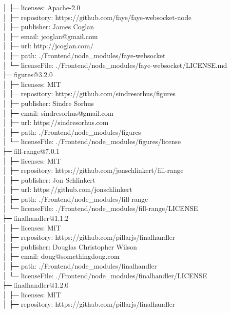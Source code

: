 │  ├─ licenses: Apache-2.0\\
│  ├─ repository: https://github.com/faye/faye-websocket-node\\
│  ├─ publisher: James Coglan\\
│  ├─ email: jcoglan@gmail.com\\
│  ├─ url: http://jcoglan.com/\\
│  ├─ path: ./Frontend/node\_modules/faye-websocket\\
│  └─ licenseFile: ./Frontend/node\_modules/faye-websocket/LICENSE.md\\
├─ figures@3.2.0\\
│  ├─ licenses: MIT\\
│  ├─ repository: https://github.com/sindresorhus/figures\\
│  ├─ publisher: Sindre Sorhus\\
│  ├─ email: sindresorhus@gmail.com\\
│  ├─ url: https://sindresorhus.com\\
│  ├─ path: ./Frontend/node\_modules/figures\\
│  └─ licenseFile: ./Frontend/node\_modules/figures/license\\
├─ fill-range@7.0.1\\
│  ├─ licenses: MIT\\
│  ├─ repository: https://github.com/jonschlinkert/fill-range\\
│  ├─ publisher: Jon Schlinkert\\
│  ├─ url: https://github.com/jonschlinkert\\
│  ├─ path: ./Frontend/node\_modules/fill-range\\
│  └─ licenseFile: ./Frontend/node\_modules/fill-range/LICENSE\\
├─ finalhandler@1.1.2\\
│  ├─ licenses: MIT\\
│  ├─ repository: https://github.com/pillarjs/finalhandler\\
│  ├─ publisher: Douglas Christopher Wilson\\
│  ├─ email: doug@somethingdoug.com\\
│  ├─ path: ./Frontend/node\_modules/finalhandler\\
│  └─ licenseFile: ./Frontend/node\_modules/finalhandler/LICENSE\\
├─ finalhandler@1.2.0\\
│  ├─ licenses: MIT\\
│  ├─ repository: https://github.com/pillarjs/finalhandler\\
